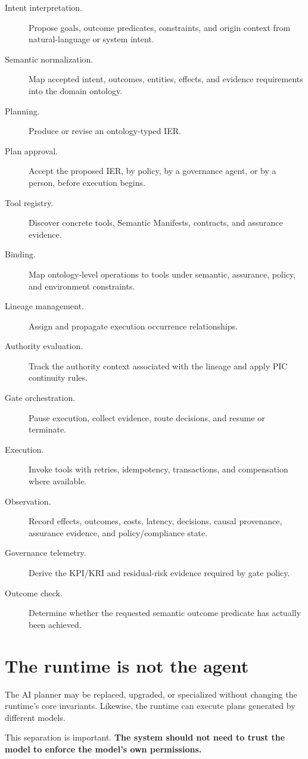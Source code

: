 \documentclass[10pt,oneside,openany]{book}
\begin{document}
\begin{description}
\item[Intent interpretation.] Propose goals, outcome predicates, constraints, and origin context from natural-language or system intent.
\item[Semantic normalization.] Map accepted intent, outcomes, entities, effects, and evidence requirements into the domain ontology.
\item[Planning.] Produce or revise an ontology-typed IER.
\item[Plan approval.] Accept the proposed IER, by policy, by a governance agent, or by a person, before execution begins.
\item[Tool registry.] Discover concrete tools, Semantic Manifests, contracts, and assurance evidence.
\item[Binding.] Map ontology-level operations to tools under semantic, assurance, policy, and environment constraints.
\item[Lineage management.] Assign and propagate execution occurrence relationships.
\item[Authority evaluation.] Track the authority context associated with the lineage and apply PIC continuity rules.
\item[Gate orchestration.] Pause execution, collect evidence, route decisions, and resume or terminate.
\item[Execution.] Invoke tools with retries, idempotency, transactions, and compensation where available.
\item[Observation.] Record effects, outcomes, costs, latency, decisions, causal provenance, assurance evidence, and policy/compliance state.
\item[Governance telemetry.] Derive the KPI/KRI and residual-risk evidence required by gate policy.
\item[Outcome check.] Determine whether the requested semantic outcome predicate has actually been achieved.
\end{description}

\section{The runtime is not the agent}
The AI planner may be replaced, upgraded, or specialized without changing the runtime's core invariants. Likewise, the runtime can execute plans generated by different models.

This separation is important. \textbf{The system should not need to trust the model to enforce the model's own permissions.}
\end{document}
